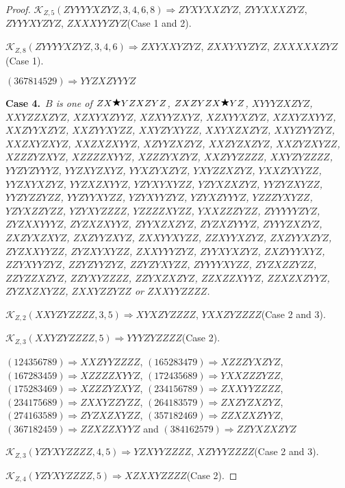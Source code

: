 \documentclass[12pt]{article}
\theoremstyle{plain}
\theoremstyle{definition}
\theoremstyle{remark}
\newcommand{\fancy}[1]{\mathcal{#1}}
\def\K{\fancy{K}}
\newcommand{\case}[2]{{\bf Case #1.}~{\it #2}~~}
\newcommand{\wild}{\raisebox{0.75\depth}{$\bigstar$}}
\begin{document}
\begin{proof}
	
	$\K_{Z,5}(ZYYYYXZYZ,3, 4, 6, 8)\Rightarrow $$ZYXYXXZYZ$, $ZYYXXXZYZ$, $ZYYYXYZYZ$, $ZXXXYYZYZ$(Case 1 and 2).
	
	$\K_{Z,8}(ZYYYYXZYZ,3, 4, 6)\Rightarrow $$ZXYXXYZYZ$, $ZXXYXYZYZ$, $ZXXXXXZYZ$(Case 1).
	
	
	
	$(3 6 7 8 1 4 5 2 9)\Rightarrow YYZXZYYYZ$
	
	
	
	
	\bigskip
	\case{4}{$B$ is one of $ZX\wild YZXZYZ$, $ZXZYZX\wild YZ$, $XYYYZXZYZ$, $XXYZZXZYZ$, $XZXYXZYYZ$, $XZXYYZXYZ$, $XZXYYXZYZ$, $XZXYZXYYZ$, $XXZYYXZYZ$, $XXZYYXYZZ$, $XXYZYXYZZ$, $XXYXZXZYZ$, $XXYZYYZYZ$, $XXZXYZXYZ$, $XXZXZXYYZ$, $XZYYZXZYZ$, $XXZYZXZYZ$, $XXZYZXYZZ$, $XZZZYZXYZ$, $XZZZZXYYZ$, $XZZZYXZYZ$, $XXZYYZZZZ$, $XXYZYZZZZ$, $YYZYZYYYZ$, $YYZXYZXYZ$, $YYXZYXZYZ$, $YXYZZXZYZ$, $YXXZYXYZZ$, $YYZXYXZYZ$, $YYZXZXYYZ$, $YZYXYXYZZ$, $YZYXZXZYZ$, $YYZYZXYZZ$, $YYZYZZYZZ$, $YYZYYXYZZ$, $YZYXYYZYZ$, $YZYXZYYYZ$, $YZZZYXYZZ$, $YZYXZZYZZ$, $YZYXYZZZZ$, $YZZZZXYZZ$, $YXXZZZYZZ$, $ZYYYYYZYZ$, $ZYZXXYYYZ$, $ZYZXZXYYZ$, $ZYYXZXZYZ$, $ZYZXZYYYZ$, $ZYYYZXZYZ$, $ZXZYXZXYZ$, $ZXZYYZXYZ$, $ZXXYYXYZZ$, $ZZXYYXZYZ$, $ZXZYYXZYZ$, $ZYZXXYYZZ$, $ZYZXYXYZZ$, $ZXXYYYZYZ$, $ZYYXYXZYZ$, $ZXZYYYXYZ$, $ZZYXYYZYZ$, $ZZYZYYZYZ$, $ZZYZYXYZZ$, $ZYYYYXYZZ$, $ZYZXZZYZZ$, $ZZYZZXZYZ$, $ZZYXYZZZZ$, $ZZYXZXZYZ$, $ZZXZZXYYZ$, $ZZXZXZYYZ$, $ZYZXZXYZZ$, $ZXXYZZYZZ$ or $ZXXYYZZZZ$.}
	
	\bigskip
	
	$\K_{Z,2}(XXYZYZZZZ,3, 5)\Rightarrow $$XYXZYZZZZ$, $YXXZYZZZZ$(Case 2 and 3).
	
	$\K_{Z,3}(XXYZYZZZZ,5)\Rightarrow $$YYYZYZZZZ$(Case 2).
	
	
	
	$(1 2 4 3 5 6 7 8 9)\Rightarrow XXZYYZZZZ$, $(1 6 5 2 8 3 4 7 9)\Rightarrow XZZZYXZYZ$, $(1 6 7 2 8 3 4 5 9)\Rightarrow XZZZZXYYZ$, $(1 7 2 4 3 5 6 8 9)\Rightarrow YXXZZZYZZ$, $(1 7 5 2 8 3 4 6 9)\Rightarrow XZZZYZXYZ$, $(2 3 4 1 5 6 7 8 9)\Rightarrow ZXXYYZZZZ$, $(2 3 4 1 7 5 6 8 9)\Rightarrow ZXXYZZYZZ$, $(2 6 4 1 8 3 5 7 9)\Rightarrow ZXZYZXZYZ$, $(2 7 4 1 6 3 5 8 9)\Rightarrow ZYZXZXYZZ$, $(3 5 7 1 8 2 4 6 9)\Rightarrow ZZXZXZYYZ$, $(3 6 7 1 8 2 4 5 9)\Rightarrow ZZXZZXYYZ$ and $(3 8 4 1 6 2 5 7 9)\Rightarrow ZZYXZXZYZ$
	
	
	$\K_{Z,3}(YZYXYZZZZ,4, 5)\Rightarrow $$YZXYYZZZZ$, $XZYYYZZZZ$(Case 2 and 3).
	
	$\K_{Z,4}(YZYXYZZZZ,5)\Rightarrow $$XZXXYZZZZ$(Case 2).
	
	
	

\end{proof}
\end{document}
